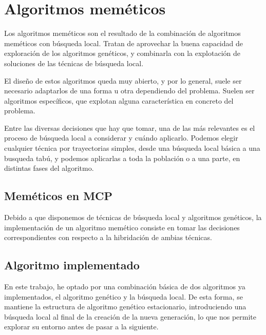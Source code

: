 \section{Algoritmos meméticos}

Los algoritmos meméticos son el resultado de la combinación de algoritmos meméticos
con búsqueda local. Tratan de aprovechar la buena capacidad de exploración de los
algoritmos genéticos, y combinarla con la explotación de soluciones de las técnicas
de búsqueda local.

El diseño de estos algoritmos queda muy abierto, y por lo general, suele ser necesario
adaptarlos de una forma u otra dependiendo del problema. Suelen ser algoritmos específicos,
que explotan alguna característica en concreto del problema.

Entre las diversas decisiones que hay que tomar, una de las más relevantes es el
proceso de búsqueda local a considerar y cuándo aplicarlo. Podemos elegir cualquier
técnica por trayectorias simples, desde una búsqueda local básica a una busqueda
tabú, y podemos aplicarlas a toda la población o a una parte, en distintas
fases del algoritmo.

\subsection{Meméticos en MCP}

Debido a que disponemos de técnicas de búsqueda local y algoritmos genéticos,
la implementación de un algoritmo memético consiste en tomar las decisiones
correspondientes con respecto a la hibridación de ambias técnicas.

\subsection{Algoritmo implementado}

En este trabajo, he optado por una combinación básica de dos algoritmos ya implementados,
el algoritmo genético y la búsqueda local. De esta forma, se mantiene la estructura
de algoritmo genético estacionario, introduciendo una búsqueda local al final de
la creación de la nueva generación, lo que nos permite explorar su entorno antes de
pasar a la siguiente.
